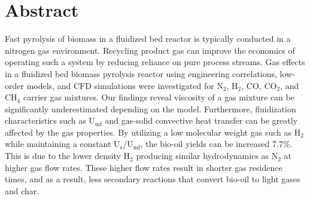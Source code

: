 
\section*{Abstract}

Fast pyrolysis of biomass in a fluidized bed reactor is typically conducted in a nitrogen gas environment. Recycling product gas can improve the economics of operating such a system by reducing reliance on pure process streams. Gas effects in a fluidized bed biomass pyrolysis reactor using engineering correlations, low-order models, and CFD simulations were investigated for N$_2$, H$_2$, CO, CO$_2$, and CH$_4$ carrier gas mixtures. Our findings reveal viscosity of a gas mixture can be significantly underestimated depending on the model. Furthermore, fluidization characteristics such as U$_\textrm{mf}$ and gas-solid convective heat transfer can be greatly affected by the gas properties. By utilizing a low molecular weight gas such as H$_2$ while maintaining a constant U$_\text{s}$/U$_\text{mf}$, the bio-oil yields can be increased 7.7\%. This is due to the lower density H$_2$ producing similar hydrodynamics as N$_2$ at higher gas flow rates. These higher flow rates result in shorter gas residence times, and as a result, less secondary reactions that convert bio-oil to light gases and char.
